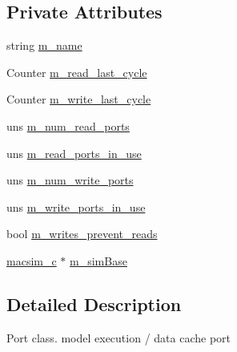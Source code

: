 \subsection*{Private Attributes}
\begin{DoxyCompactItemize}
\item 
string \hyperlink{classport__c_a2b44eaf0273caec8c39cce0a415c3374}{m\_\-name}
\item 
Counter \hyperlink{classport__c_acd222eb5127ef8d6766f47c8de56ccf3}{m\_\-read\_\-last\_\-cycle}
\item 
Counter \hyperlink{classport__c_a74c23b29afab394edfbafac725b24fe9}{m\_\-write\_\-last\_\-cycle}
\item 
uns \hyperlink{classport__c_abd7a8bdfe7fb296394ef5069f99cf7b1}{m\_\-num\_\-read\_\-ports}
\item 
uns \hyperlink{classport__c_ac1be920cefbf209a4cef23d32cbbc1b7}{m\_\-read\_\-ports\_\-in\_\-use}
\item 
uns \hyperlink{classport__c_a11d136595f0237804f421c7ab5318789}{m\_\-num\_\-write\_\-ports}
\item 
uns \hyperlink{classport__c_a2f3b34b182e72b0f371651c0d433cc50}{m\_\-write\_\-ports\_\-in\_\-use}
\item 
bool \hyperlink{classport__c_a5cb3565a6b897c5e059e25e33cff849a}{m\_\-writes\_\-prevent\_\-reads}
\item 
\hyperlink{classmacsim__c}{macsim\_\-c} $\ast$ \hyperlink{classport__c_a2730e74a6ee249d570e02d1963d287cf}{m\_\-simBase}
\end{DoxyCompactItemize}


\subsection{Detailed Description}
Port class. model execution / data cache port 

